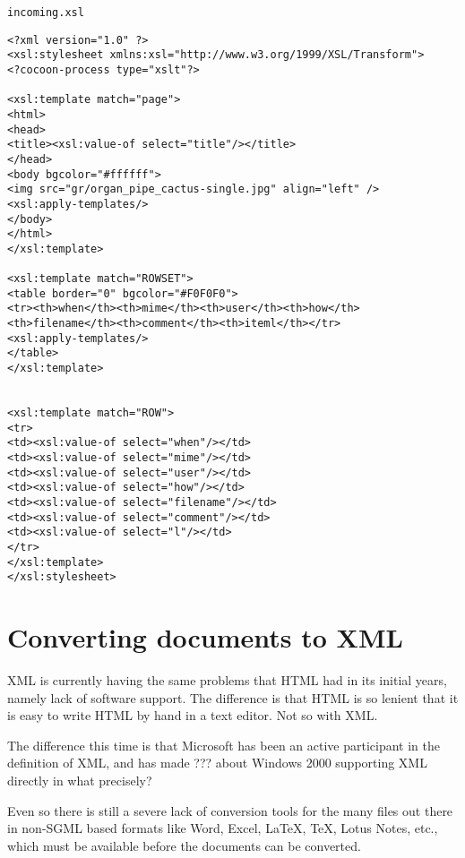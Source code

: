 \texttt{incoming.xsl}
\begin{verbatim}
<?xml version="1.0" ?>
<xsl:stylesheet xmlns:xsl="http://www.w3.org/1999/XSL/Transform">
<?cocoon-process type="xslt"?>

<xsl:template match="page">
<html>
<head>
<title><xsl:value-of select="title"/></title>
</head>
<body bgcolor="#ffffff">
<img src="gr/organ_pipe_cactus-single.jpg" align="left" />
<xsl:apply-templates/>
</body>
</html>
</xsl:template>

<xsl:template match="ROWSET">
<table border="0" bgcolor="#F0F0F0">
<tr><th>when</th><th>mime</th><th>user</th><th>how</th><th>filename</th><th>comment</th><th>iteml</th></tr>
<xsl:apply-templates/>
</table>
</xsl:template>


<xsl:template match="ROW">
<tr> 
<td><xsl:value-of select="when"/></td>
<td><xsl:value-of select="mime"/></td>
<td><xsl:value-of select="user"/></td>
<td><xsl:value-of select="how"/></td>
<td><xsl:value-of select="filename"/></td>
<td><xsl:value-of select="comment"/></td>
<td><xsl:value-of select="l"/></td>
</tr>
</xsl:template>
</xsl:stylesheet>
\end{verbatim}


\section{Converting documents to XML}

XML is currently having the same problems that HTML had in its initial
years, namely lack of software support.  The difference is that HTML
is so lenient that it is easy to write HTML by hand in a text editor.
Not so with XML.

The difference this time is that Microsoft has been an active
participant in the \textsf{definition of XML}, and has made
\textsf{???} about Windows 2000 supporting XML directly \textsf{in
  what precisely?}

Even so there is still a severe lack of conversion tools for the many
files out there in non-SGML based formats like Word, Excel, {\LaTeX},
{\TeX}, Lotus Notes, etc., which must be available before the
documents can be converted.    

